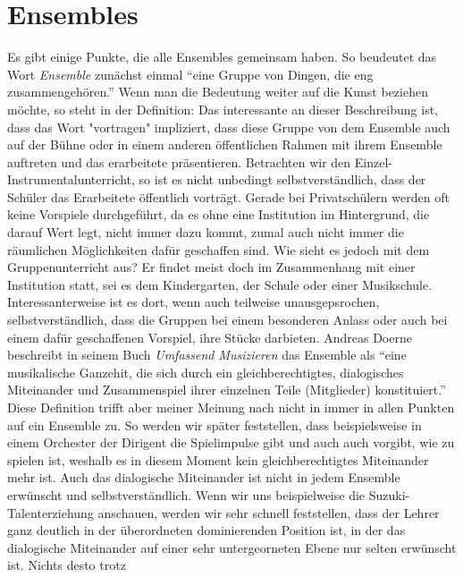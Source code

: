 \section{Ensembles}

Es gibt einige Punkte, die alle Ensembles gemeinsam haben. So beudeutet das Wort
\emph{Ensemble} zunächst einmal \enquote{eine Gruppe von Dingen, die eng
zusammengehören.}
Wenn man die Bedeutung weiter auf die Kunst beziehen möchte, so steht in der
Definition: \autocite{eine Gruppe von Künstlern -wie Schauspieler, oder Musiker,
die gemeinsam etwas vortragen.} %
Das interessante an dieser Beschreibung ist, dass das Wort "vortragen"
impliziert, dass diese Gruppe von dem Ensemble auch auf der Bühne oder in einem
anderen öffentlichen Rahmen mit ihrem Ensemble auftreten und das erarbeitete
präsentieren. Betrachten wir den Einzel- Instrumentalunterricht, so ist es nicht
unbedingt selbstverständlich, dass der Schüler das Erarbeitete öffentlich
vorträgt. Gerade bei Privatschülern werden oft keine Vorspiele durchgeführt, da
es ohne eine Institution im Hintergrund, die darauf Wert legt, nicht immer dazu
kommt, zumal auch nicht immer die räumlichen Möglichkeiten dafür geschaffen
sind. Wie sieht es jedoch mit dem Gruppenunterricht aus? Er findet meist doch im
Zusammenhang mit einer Institution statt, sei es dem Kindergarten, der Schule
oder einer Musikschule. Interessanterweise ist es dort, wenn auch teilweise
unausgepsrochen, selbstverständlich, dass die Gruppen bei einem besonderen
Anlass oder auch bei einem dafür geschaffenen Vorspiel, ihre Stücke darbieten.
Andreas Doerne beschreibt in seinem Buch \emph{Umfassend Musizieren} das
Ensemble als \enquote{eine musikalische Ganzehit, die sich durch ein
gleichberechtigtes, dialogisches Miteinander und Zusammenspiel ihrer einzelnen
Teile (Mitglieder) konstituiert.} \autocite[62]{doerne:umfassend_musizieren}
Diese Definition trifft aber meiner Meinung nach nicht in immer in allen Punkten
auf ein Ensemble zu. So werden wir später feststellen, dass beispielsweise in
einem Orchester der Dirigent die Spielimpulse gibt und auch auch vorgibt, wie zu
spielen ist, weshalb es in diesem Moment kein gleichberechtigtes Miteinander
mehr ist. Auch das dialogische Miteinander ist nicht in jedem Ensemble erwünscht
und selbstverständlich. Wenn wir uns beispielweise die Suzuki-Talenterziehung
anschauen, werden wir sehr schnell feststellen, dass der Lehrer ganz deutlich in
der überordneten dominierenden Position ist, in der das dialogische Miteinander
auf einer sehr untergeorneten Ebene nur selten erwünscht ist. Nichts desto trotz
